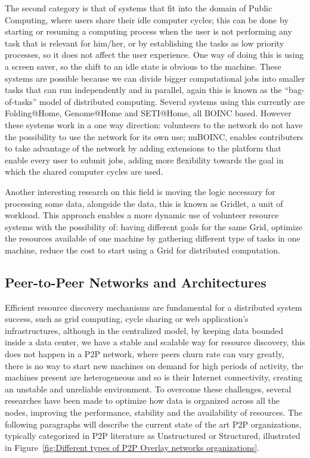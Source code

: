 The second category is that of systems that fit into the domain of Public Computing, where users share their idle computer cycles; this can be done by starting or resuming a computing process when the user is not performing any task that is relevant for him/her, or by establishing the tasks as low priority processes, so it does not affect the user experience. One way of doing this is using a screen saver, so the shift to an idle state is obvious to the machine. These systems are possible because we can divide bigger computational jobs into smaller tasks that can run independently and in parallel, again this is known as the ``bag-of-tasks'' model of distributed computing. Several systems using this currently are Folding@Home, Genome@Home\cite{Larson2002} and SETI@Home\cite{Anderson2002}\cite{Korpela2001}, all BOINC\cite{Anderson2015} based. However these systems work in a one way direction: volunteers to the network do not have the possibility to use the network for its own use; nuBOINC\cite{Silva2008}, enables contributers to take advantage of the network by adding extensions to the platform that enable every user to submit jobs, adding more flexibility towards the goal in which the shared computer cycles are used. 

Another interesting research on this field is moving the logic necessary for processing some data, alongside the data, this is known as Gridlet\cite{Costa2012}\cite{Rodrigues}, a unit of workload. This approach enables a more dynamic use of volunteer resource systems with the possibility of: having different goals for the same Grid, optimize the resources available of one machine by gathering different type of tasks in one machine, reduce the cost to start using a Grid for distributed computation.

\subsection{Peer-to-Peer Networks and Architectures}  
Efficient resource discovery mechanisms are fundamental for a distributed system success, such as grid computing, cycle sharing or web application's infrastructures\cite{Ranjan2006}, although in the centralized model, by keeping data bounded inside a data center, we have a stable and scalable way for resource discovery, this does not happen in a P2P network, where peers churn rate can vary greatly, there is no way to start new machines on demand for high periods of activity, the machines present are heterogeneous and so is their Internet connectivity, creating an unstable and unreliable environment. To overcome these challenges, several researches have been made to optimize how data is organized across all the nodes, improving the performance, stability and the availability of resources. The following paragraphs will describe the current state of the art P2P organizations, typically categorized in P2P literature as Unstructured or Structured\cite{Milojicic2003}, illustrated in Figure~\ref{fig:Different types of P2P Overlay networks organizations}.

